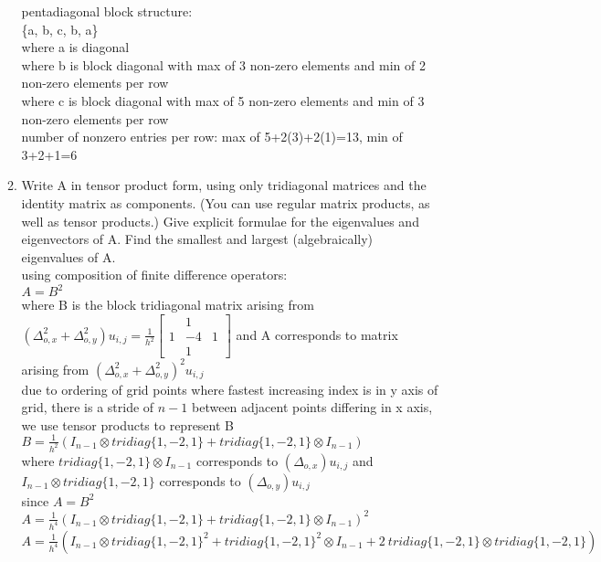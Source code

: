 \documentclass[12pt,letter]{article}
\begin{document}
\begin{enumerate}
\begin{enumerate}
    pentadiagonal block structure:\\
    \{a, b, c, b, a\}\\
    where a is diagonal\\
    where b is block diagonal with max of 3 non-zero elements and min of 2 non-zero elements per row\\
    where c is block diagonal with max of 5 non-zero elements and min of 3 non-zero elements per row\\
    
    number of nonzero entries per row: max of 5+2(3)+2(1)=13, min of 3+2+1=6\\

    \pagebreak
    
  \item Write A in tensor product form, using only tridiagonal matrices and the identity matrix as components. (You can use regular matrix products, as well as tensor products.) Give explicit formulae for the eigenvalues and eigenvectors of A. Find the smallest and largest (algebraically) eigenvalues of A.\\

    using composition of finite difference operators:\\
    $A=B^2$\\
    where B is the block tridiagonal matrix arising from $(\Delta_{o,x}^2+\Delta_{o,y}^2) u_{i,j}=\frac{1}{h^2}\begin{bmatrix} & 1 & \\ 1 & -4 & 1\\ & 1 & \end{bmatrix}$ and A corresponds to matrix arising from $(\Delta_{o,x}^2+\Delta_{o,y}^2)^2 u_{i,j}$\\
    
    due to ordering of grid points where fastest increasing index is in y axis of grid, there is a stride of $n-1$ between adjacent points differing in x axis, we use tensor products to represent B\\
    
    $B = \frac{1}{h^2}(I_{n-1} \otimes tridiag\{1,-2,1\} + tridiag\{1,-2,1\} \otimes I_{n-1})$\\
    
    where $tridiag\{1,-2,1\} \otimes I_{n-1}$ corresponds to $(\Delta_{o,x})u_{i,j}$ and $I_{n-1} \otimes tridiag\{1,-2,1\}$ corresponds to $(\Delta_{o,y})u_{i,j}$\\

    since $A=B^2$\\
    $A=\frac{1}{h^4}(I_{n-1} \otimes tridiag\{1,-2,1\} + tridiag\{1,-2,1\} \otimes I_{n-1})^2$\\
    $A=\frac{1}{h^4}(I_{n-1} \otimes tridiag\{1,-2,1\}^2 + tridiag\{1,-2,1\}^2 \otimes I_{n-1}+
    2\ tridiag\{1,-2,1\} \otimes tridiag\{1,-2,1\})$\\


\end{enumerate}
\end{enumerate}
\end{document}
